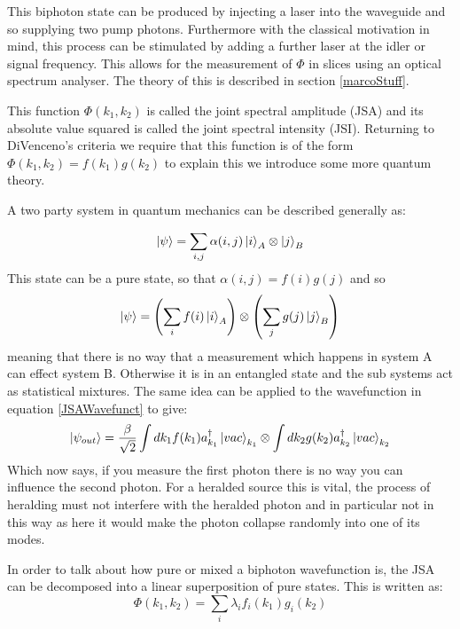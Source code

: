 This biphoton state can be produced by injecting a laser into the waveguide and so supplying two pump photons. Furthermore with the classical motivation in mind, this process can be stimulated by adding a further laser at the idler or signal frequency. This allows for the measurement of $\Phi$ in slices using an optical spectrum analyser. The theory of this is described in section \ref{marcoStuff}.


This function $\Phi(k_1,k_2)$ is called the joint spectral amplitude (JSA) and its absolute value squared is called the joint spectral intensity (JSI). Returning to DiVenceno's criteria we require that this function is of the form $\Phi(k_1,k_2)=f(k_1)g(k_2)$ to explain this we introduce some more quantum theory.

A two party system in quantum mechanics can be described generally as:

\begin{equation}
\ket{\psi} = \sum_{i,j}\alpha(i,j)\ket{i}_A\otimes\ket{j}_B 
\end{equation}
\noindent
This state can be a pure state, so that $\alpha(i,j)=f(i)g(j)$ and so
\begin{equation}
\ket{\psi} = \left (\sum_{i}f(i)\ket{i}_A \right ) \otimes \left (\sum_{j}g(j)\ket{j}_B \right )
\end{equation}
meaning that there is no way that a measurement which happens in system A can effect system B. Otherwise it is in an entangled state and the sub systems act as statistical mixtures. The same idea can be applied to the wavefunction in equation \ref{JSAWavefunct} to give:
\begin{equation}
\ket{\psi_{out}}=\frac{\beta}{\sqrt{2}}\int dk_1f(k_1)a_{k_1}^{\dagger}\ket{vac}_{k_1}\otimes \int dk_2g(k_2)a_{k_2}^{\dagger} \ket{vac}_{k_2}
\end{equation}
Which now says, if you measure the first photon there is no way you can influence the second photon. For a heralded source this is vital, the process of heralding must not interfere with the heralded photon and in particular not in this way as here it would make the photon collapse randomly into one of its modes.




In order to talk about how pure or mixed a biphoton wavefunction is, the JSA can be decomposed into a linear superposition of pure states. This is written as\cite{harder_optimized_2013}:
\begin{equation} \label{modes}
	\Phi(k_1,k_2) = \sum_i \lambda_if_i(k_1)g_i(k_2)
\end{equation}

